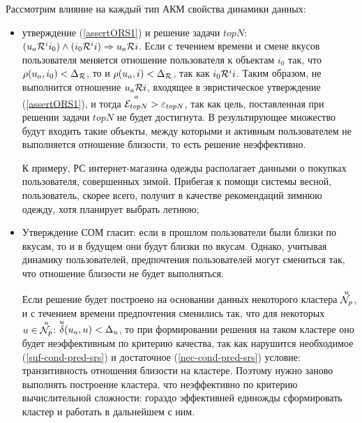 Рассмотрим влияние на каждый тип АКМ свойства динамики данных:
\begin{itemize}
	\item утверждение (\ref{assertORS1}) и решение задачи $topN$:
		$(u_a \mathcal{R}^i i_0) \wedge (i_0 \mathcal{R}^i i) \Rightarrow u_a \mathcal{R} i$.
		Если с течением времени и смене вкусов пользователя меняется отношение
		пользователя к объектам $i_0$ так, что $\rho(u_a,i_0) < \Delta_{\mathcal{R}}$,
		то и $\rho(u_a,i) < \Delta_{\mathcal{R}}$, так как $i_0 \mathcal{R}^i i$.
		Таким образом, не выполнится отношение $u_a \mathcal{R} i$, входящее
		в эвристическое утверждение (\ref{assertORS1}), и тогда
		${\overset{a}{\mathcal{E}_{topN}}} > \varepsilon_{topN}$, так как цель,
		поставленная при решении задачи $topN$ не будет достигнута. В
		результирующее множество будут входить такие объекты, между которыми и
		активным пользователем не выполняется отношение близости, то есть
		решение неэффективно.

		К примеру, РС интернет-магазина одежды располагает
		данными о покупках пользователя, совершенных зимой. Прибегая к помощи
		системы весной, пользователь, скорее всего, получит в качестве рекомендаций
		зимнюю одежду, хотя планирует выбрать летнюю;

	\item Утверждение СОМ гласит: если в прошлом пользователи были близки по вкусам,
		то и в будущем они будут близки по вкусам. Однако, учитывая динамику
		пользователей, предпочтения пользователей могут смениться так, что
		отношение близости не будет выполняться.

		Если решение будет построено на основании данных некоторого кластера
		${\overset{u}{\mathcal{N}_p}}$, и с течением времени предпочтения сменились так, что
		для некоторых $u \in {\overset{u}{\mathcal{N}_p}}$: ${\overset{u}{\mathcal{\delta}}}(u_a, u) < \Delta_u$, то при
		формировании решения на таком кластере оно будет неэффективным по
		критерию качества, так как нарушится необходимое
		(\ref{suf-cond-pred-srs}) и достаточное (\ref{nec-cond-pred-srs})
		условие: транзитивность отношения близости на кластере.
		Поэтому нужно заново выполнять построение
		кластера, что неэффективно по критерию вычислительной сложности:
		гораздо эффективней единожды сформировать кластер и работать в дальнейшем с
		ним.
\end{itemize}

